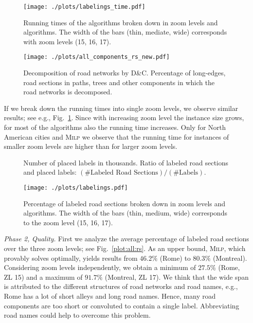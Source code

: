 \documentclass[a4paper,11pt]{article}
\newcommand{\ILPAlgo}{\textsc{Milp}\xspace}
\newcommand{\Shredder}{\textsc{D\&C}}
\begin{document}
\begin{figure}[t]
\centering
\texttt{[image: ./plots/labelings\_time.pdf]}
\caption{Running times of the algorithms broken down in zoom levels and algorithms. The width of the bars (thin, mediate, wide) corresponds with zoom levels (15, 16, 17). 
}
\label{fig:running-time:selection}
\end{figure}

\begin{figure}[t]
\centering
\texttt{[image: ./plots/all\_components\_rs\_new.pdf]}
\caption{
Decomposition of road networks by \Shredder. Percentage of long-edges, road sections in paths, trees and other components in which the road networks is decomposed.   }
\label{fig:components}
\end{figure}



If we break down the running times into single zoom levels, we observe
similar results; see e.g.,
Fig.~\ref{fig:running-time:selection}. Since with increasing zoom level the instance size grows, for most of the algorithms also the
running time increases. Only for North American cities and \ILPAlgo we
observe that the running time for instances of smaller zoom levels are
higher than for larger zoom levels.

\begin{figure}[t]
\centering
{}
\caption{ Number of placed labels in thousands.  Ratio of labeled road sections and placed labels: ${(\#\text{Labeled Road Sections})}/{(\#\text{Labels})}$.
}
\label{apx:fig:number-of-labels}
\end{figure}

\begin{figure}[t]
\centering
\texttt{[image: ./plots/labelings.pdf]}
\caption{Percentage of labeled road sections broken down in zoom levels and algorithms. The width of the bars (thin, medium, wide) corresponds to the zoom level  (15, 16, 17). 
}
\label{fig:quality:selection}
\vspace{-2ex}
\end{figure}

\textit{Phase 2, Quality.} First we analyze the average percentage of labeled
road sections over the three zoom levels; see
Fig.~\ref{plot:all:rs}. As an upper bound, \ILPAlgo, which provably 
solves \MaxTotalCovering optimally, yields results from $46.2\%$ (Rome) to
$80.3\%$ (Montreal). Considering zoom levels independently, we obtain
a minimum of $27.5\%$ (Rome, ZL 15) and a maximum of  $91.7\%$ (Montreal, ZL 17). We think that the wide span is attributed to the different
structures of road networks and road names, e.g., Rome has a lot of
short alleys and long road names. Hence, many road components are too
short or convoluted to contain a single label. Abbreviating road names
could help to overcome this problem.
\end{document}
